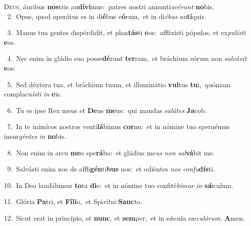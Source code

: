 \lettrine{\initial\textcolor{\initialcolor}{D}}{eus,} áuribus \textbf{nos}\-tris au\-\textbf{dí}\-\textbf{vi}mus:~\star patres nostri annunti\-\textit{a}\-\textit{vé}\textit{runt} \textbf{no}\-bis.\\
{\numbfont\textcolor{\numbcolor}{~2.}}~Opus, quod operátus es in di\-\textbf{é}\-bus e\-\textbf{ó}\-rum,~\star et in di\-\textit{é}\-\textit{bus} \textit{an}\-\textbf{tí}quis.\par
{\numbfont\textcolor{\numbcolor}{~3.}}~Manus tua gentes dispérdidit, et plan\-\textbf{tás}\-ti \textbf{e}\-os:~\star afflixísti pópulos, et ex\-\textit{pu}\-\textit{lís}\textit{ti} \textbf{e}\-os.\par
{\numbfont\textcolor{\numbcolor}{~4.}}~Nec enim in gládio suo posse\-\textbf{dé}\-runt \textbf{ter}\-ram,~\star et bráchium eórum non \textit{sal}\-\textit{vá}\textit{vit} \textbf{e}\-os:\par
{\numbfont\textcolor{\numbcolor}{~5.}}~Sed déxtera tua, et bráchium tuum, et illuminátio \textbf{vul}\-tus \textbf{tu}\-i,~\star quóniam complacu\-\textit{ís}\-\textit{ti} \textit{in} \textbf{e}\-is.\par
{\numbfont\textcolor{\numbcolor}{~6.}}~Tu es ipse Rex meus et \textbf{De}\-us \textbf{me}\-us:~\star qui mandas \textit{sa}\-\textit{lú}\textit{tes} \textbf{Ja}\-cob.\par
{\numbfont\textcolor{\numbcolor}{~7.}}~In te inimícos nostros venti\-\textbf{lá}\-bimus \textbf{cor}\-nu:~\star et in nómine tuo spernémus insur\-\textit{gén}\-\textit{tes} \textit{in} \textbf{no}\-bis.\par
{\numbfont\textcolor{\numbcolor}{~8.}}~Non enim in arcu \textbf{me}\-o spe\-\textbf{rá}\-bo:~\star et gládius me\textit{us} \textit{non} \textit{sal}\-\textbf{vá}bit me.\par
{\numbfont\textcolor{\numbcolor}{~9.}}~Salvásti enim nos de affli\-\textbf{gén}\-ti\textbf{bus} nos:~\star et odiéntes \textit{nos} \textit{con}\-\textit{fu}\textbf{dís}ti.\par
{\numbfont\textcolor{\numbcolor}{10.}}~In Deo laudábimur \textbf{to}\-ta \textbf{di}\-e:~\star et in nómine tuo confité\-\textit{bi}\-\textit{mur} \textit{in} \textbf{sǽ}\-culum.\par
{\numbfont\textcolor{\numbcolor}{11.}}~Glória \textbf{Pa}\-tri, et \textbf{Fí}\-\textbf{li}o,~\star et Spi\-\textit{rí}\-\textit{tu}\textit{i} \textbf{Sanc}\-to.\par
{\numbfont\textcolor{\numbcolor}{12.}}~Sicut erat in princípio, et \textbf{nunc}\-, et \textbf{sem}\-per,~\star et in sǽcula sæ\-\textit{cu}\-\textit{ló}\textit{rum}. \textbf{A}\-men.\par
